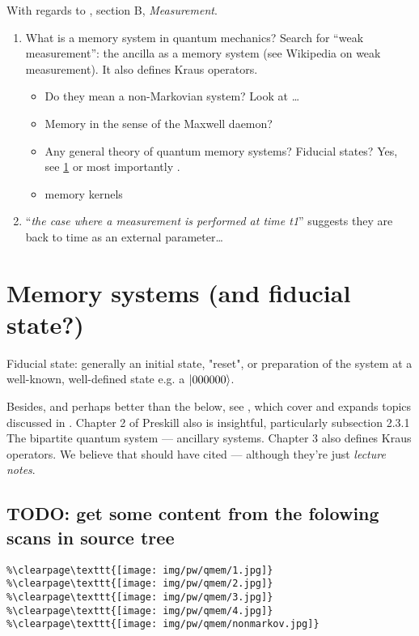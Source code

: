 With regards to \cite{Lloyd:Time}, section B, \textit{Measurement}.

\begin{enumerate}
  \item What is a memory system in quantum mechanics? Search for ``weak measurement'': the ancilla as a memory system (see Wikipedia on weak measurement). It also defines Kraus operators.
  \begin{itemize}
    \item Do they mean a non-Markovian system? Look at \cite{MeasurementMarkovian}\dots
    \item Memory in the sense of the Maxwell daemon?
    \item
      Any general theory of quantum memory systems? Fiducial states?
      Yes, see \ref{sec:qmemory} or most importantly \cite[Ch.~3]{PreskillNotes}.
    \item memory kernels \cite{CarmichaelOQS2017}
  \end{itemize}
  \item ``\emph{the case where a measurement is performed at time t1}'' suggests they are back to time as an external parameter\dots
\end{enumerate}

\section{Memory systems (and fiducial state?)}\label{sec:qmemory}

Fiducial state: generally an initial state, "reset", or
preparation of the system at a well-known, well-defined state
e.g. a $\ket{000000}$.

Besides, and perhaps better than the below, see \cite[Ch.~3]{PreskillNotes},
which cover and expands topics discussed in \cite{open_systems}. Chapter 2
of Preskill \cite{PreskillNotes} also is insightful, particularly
subsection 2.3.1 The bipartite quantum system --- ancillary systems. Chapter 3
also defines Kraus operators. We believe that \cite{Lloyd:Time} should
have cited \cite{PreskillNotes} --- although they're just \emph{lecture notes}.

\subsection{TODO: get some content from the folowing scans in source tree}
\begin{verbatim}
%\clearpage\texttt{[image: img/pw/qmem/1.jpg]}
%\clearpage\texttt{[image: img/pw/qmem/2.jpg]}
%\clearpage\texttt{[image: img/pw/qmem/3.jpg]}
%\clearpage\texttt{[image: img/pw/qmem/4.jpg]}
%\clearpage\texttt{[image: img/pw/qmem/nonmarkov.jpg]}
\end{verbatim}

